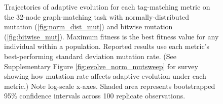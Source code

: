 \begin{figure}[!htbp]
\begin{minipage}{6in}
\begin{center}
\begin{minipage}{\linewidth}
\caption{
Trajectories of adaptive evolution for each tag-matching metric on the 32-node graph-matching task with normally-distributed mutation (\ref{fig:norm_dist_mut}) and bitwise mutation (\ref{fig:bitwise_mut}).
Maximum fitness is the best fitness value for any individual within a population.
Reported results use each metric's best-performing standard deviation mutation rate.
(See Supplementary Figure \ref{fig:evolve_norm_mutsweep} for survey showing how mutation rate affects adaptive evolution under each metric.)
Note log-scale x-axes.
Shaded area represents bootstrapped 95\% confidence intervals across 100 replicate observations.
}
\label{fig:evolve_bests_norm}
\end{minipage}
\end{center}
\end{minipage}
\end{figure}
